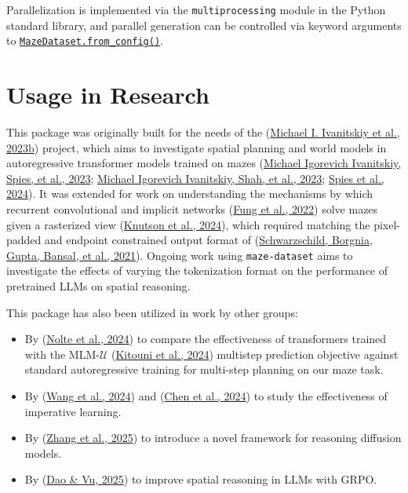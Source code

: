 \documentclass[10pt,a4paper,onecolumn]{article}
\begin{document}
Parallelization is implemented via the \texttt{multiprocessing} module
in the Python standard library, and parallel generation can be
controlled via keyword arguments to
\href{https://understanding-search.github.io/maze-dataset/maze_dataset.html\#MazeDataset.from_config}{\texttt{MazeDataset.from\_config()}}.

\hypertarget{usage-in-research}{%
\section{Usage in Research}\label{usage-in-research}}

This package was originally built for the needs of the
(\protect\hyperlink{ref-maze-transformer-github}{Michael I. Ivanitskiy
et al., 2023b}) project, which aims to investigate spatial planning and
world models in autoregressive transformer models trained on mazes
(\protect\hyperlink{ref-ivanitskiy2023structuredworldreps}{Michael
Igorevich Ivanitskiy, Spies, et al., 2023};
\protect\hyperlink{ref-maze-dataset-arxiv-2023}{Michael Igorevich
Ivanitskiy, Shah, et al., 2023};
\protect\hyperlink{ref-spies2024causalworldmodels}{Spies et al., 2024}).
It was extended for work on understanding the mechanisms by which
recurrent convolutional and implicit networks
(\protect\hyperlink{ref-fung2022jfb}{Fung et al., 2022}) solve mazes
given a rasterized view
(\protect\hyperlink{ref-knutson2024logicalextrapolation}{Knutson et al.,
2024}), which required matching the pixel-padded and endpoint
constrained output format of
(\protect\hyperlink{ref-easy_to_hard}{Schwarzschild, Borgnia, Gupta,
Bansal, et al., 2021}). Ongoing work using \texttt{maze-dataset} aims to
investigate the effects of varying the tokenization format on the
performance of pretrained LLMs on spatial reasoning.

This package has also been utilized in work by other groups:

\begin{itemize}
\item
  By (\protect\hyperlink{ref-nolte2024multistep}{Nolte et al., 2024}) to
  compare the effectiveness of transformers trained with the
  MLM-\(\mathcal{U}\)
  (\protect\hyperlink{ref-MLMU-kitouni2024factorization}{Kitouni et al.,
  2024}) multistep prediction objective against standard autoregressive
  training for multi-step planning on our maze task.
\item
  By (\protect\hyperlink{ref-wang2024imperative}{Wang et al., 2024}) and
  (\protect\hyperlink{ref-chen2024iaimperative}{Chen et al., 2024}) to
  study the effectiveness of imperative learning.
\item
  By (\protect\hyperlink{ref-zhang2025tscend}{Zhang et al., 2025}) to
  introduce a novel framework for reasoning diffusion models.
\item
  By (\protect\hyperlink{ref-dao2025alphamaze}{Dao \& Vu, 2025}) to
  improve spatial reasoning in LLMs with GRPO.
\end{itemize}
\end{document}
